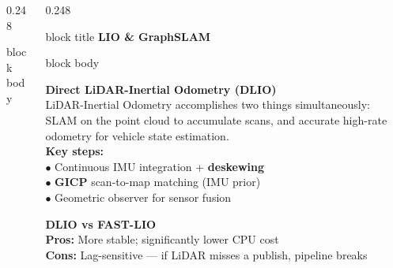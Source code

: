 \documentclass[final]{beamer}
\begin{document}
\begin{frame}[t,fragile]{}
\begin{columns}[t,totalwidth=\textwidth]
\begin{column}{0.248\textwidth}
\begin{beamercolorbox}[rounded=true,sep=0.38cm,wd=\linewidth]{block body}
\end{beamercolorbox}
\end{column}

\begin{column}{0.248\textwidth}
\begin{beamercolorbox}[rounded=true,sep=0.30cm,wd=\linewidth]{block title}
  \large\bfseries LIO \& GraphSLAM
\end{beamercolorbox}
\begin{beamercolorbox}[rounded=true,sep=0.38cm,wd=\linewidth]{block body}

  \begin{tcolorbox}[pbox]
    {\color{primary}\bfseries Direct LiDAR-Inertial Odometry (DLIO)}\\[3pt]
    \small
    LiDAR-Inertial Odometry accomplishes two things simultaneously:
    SLAM on the point cloud to accumulate scans, and accurate
    high-rate odometry for vehicle state estimation.\\[4pt]
    \textbf{Key steps:}\\
    $\bullet$ Continuous IMU integration + \textbf{deskewing}\\
    $\bullet$ \textbf{GICP} scan-to-map matching (IMU prior)\\
    $\bullet$ Geometric observer for sensor fusion
  \end{tcolorbox}

  \vspace{0.3cm}
  \begin{tcolorbox}[ybox]
    {\color{darkprimary}\bfseries DLIO vs FAST-LIO}\\[3pt]
    \small
    \textbf{Pros:} More stable; significantly lower CPU cost\\
    \textbf{Cons:} Lag-sensitive --- if LiDAR misses a publish, pipeline breaks
  \end{tcolorbox}


\end{beamercolorbox}
\end{column}
\end{columns}
\end{frame}
\end{document}
